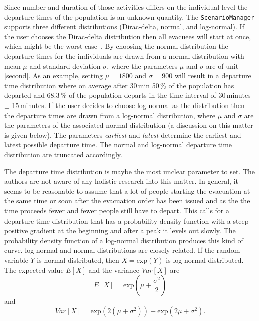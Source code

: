 \begin{itemize}
Since number and duration of those activities differs on the individual level the departure times of the population is an unknown quantity. The \lstinline|ScenarioManager| supports three different distributions (Dirac-delta, normal, and log-normal). If the user chooses the Dirac-delta distribution then all evacuees will start at once, which might be the worst case~\citep{LaemmelKluepfel2012InfluenceOfDepartureTimeDistribution}. By choosing the normal distribution the departure times for the individuals are drawn from a normal distribution with mean $\mu$ and standard deviation $\sigma$, where the parameters $\mu$ and $\sigma$ are of unit [second]. As an example, setting $\mu = 1800$ and $\sigma =  900$ will result in a departure time distribution where on average after 30\,min 50\,\% of the population has departed and 68.3\,\% of the population departs in the time interval of 30\,minutes $\pm$ 15\,minutes. If the user decides to choose log-normal as the distribution then the departure times are drawn from a log-normal distribution, where $\mu$ and $\sigma$ are the parameters of the associated normal distribution (a discussion on this matter is given below). The parameters \emph{earliest} and \emph{latest} determine the earliest and latest possible departure time. The normal and log-normal departure time distribution are truncated accordingly.
\end{itemize}
The departure time distribution is maybe the most unclear parameter to set. The authors are not aware of any holistic research into this matter. 
In general, it seems to be reasonable to assume that a lot of people starting the evacuation at the same time or soon after the evacuation order has been issued and as the the time proceeds fewer and fewer people still have to depart. 
This calls for a departure time distribution that has a probability density function with a steep positive gradient at the beginning and after a peak it levels out slowly. The probability density function of a log-normal distribution produces this kind of curve. log-normal and normal distributions are closely related. If the random variable $Y$ is normal distributed, then $X = \text{exp}(Y)$ is log-normal distributed. The expected value $E[X]$  and the variance $Var[X]$ are
\begin{equation}
E[X] = \text{exp}(\mu + \frac{\sigma^2}{2})
\end{equation}
and 
\begin{equation}
Var[X]=\text{exp}(2(\mu+\sigma^2))-\text{exp}(2\mu+\sigma^2).
\end{equation}
